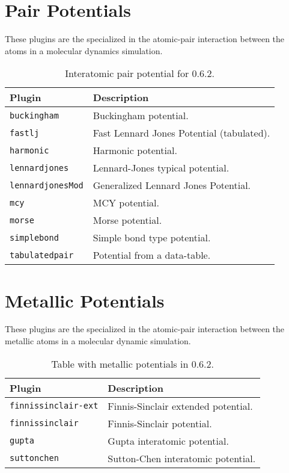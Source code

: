 \section{Pair Potentials}
These plugins are the specialized in the atomic-pair interaction between the
atoms in a molecular dynamics simulation.

\begin{table}[h!]\centering
 \begin{tabular}{|l|p{10cm}|}\hline
 Plugin & Description \\
 \hline\hline
 \texttt{buckingham} & Buckingham potential.\\
 \hline
 \texttt{fastlj} & Fast Lennard Jones Potential (tabulated). \\
 \hline
 \texttt{harmonic} & Harmonic potential.\\
 \hline
 \texttt{lennardjones} & Lennard-Jones typical potential.\\
 \hline
 \texttt{lennardjonesMod} & Generalized Lennard Jones Potential. \\
 \hline
 \texttt{mcy} & MCY potential.\\
 \hline
 \texttt{morse} & Morse potential.\\
 \hline
 \texttt{simplebond} & Simple bond type potential.\\
 \hline
 \texttt{tabulatedpair} & Potential from a data-table.\\
 \hline
 \end{tabular}
\label{tab:modpotentials}
\caption{Interatomic pair potential for {\lpmd} 0.6.2.}
\end{table}

\section{Metallic Potentials}
These plugins are the specialized in the atomic-pair interaction between the
metallic atoms in a molecular dynamic simulation.

\begin{table}[h!]\centering
 \begin{tabular}{|l|p{13cm}|}\hline
 Plugin & Description \\
 \hline\hline
 \texttt{finnissinclair-ext} & Finnis-Sinclair extended potential.\\
 \hline
 \texttt{finnissinclair} & Finnis-Sinclair potential.\\
 \hline
 \texttt{gupta} & Gupta interatomic potential.\\
 \hline
 \texttt{suttonchen} & Sutton-Chen interatomic potential.\\
 \hline
 \end{tabular}
\label{tab:modmetalpotentials}
\caption{Table with metallic potentials in {\lpmd} 0.6.2.}
\end{table}



